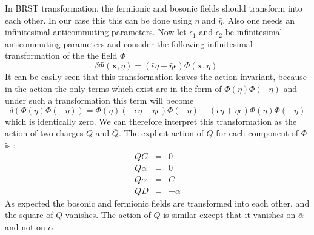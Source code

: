 \documentclass[a4paper,11pt]{article}
\begin{document}
In BRST transformation, the fermionic and bosonic fields should
transform into each other. In our case this this can be done using
$\eta$ and $\bar{\eta}$. Also one needs an infinitesimal
anticommuting parameters. Now let $\epsilon_1$ and $\epsilon_2$
be infinitesimal anticommuting parameters and consider the
following infinitesimal transformation of the the field $\Phi$
\begin{equation}\label{BRST Tr.}
\delta\Phi(\mathbf{x},\eta)=(\bar{\epsilon}\eta +
\bar{\eta}\epsilon) \Phi(\mathbf{x},\eta).
\end{equation}
It can be easily seen that this transformation leaves the action
invariant, because in the action the only terms which exist are
in the form of $\Phi(\eta)\Phi(-\eta)$ and under such a
transformation this term will become
\begin{equation}\label{delta phi2}
\delta(\Phi(\eta)\Phi(-\eta))=\Phi(\eta)(-\bar{\epsilon}\eta -
\bar{\eta}\epsilon) \Phi(-\eta)+(\bar{\epsilon}\eta +
\bar{\eta}\epsilon) \Phi(\eta)\Phi(-\eta)
\end{equation}
which is identically zero. We can therefore interpret this
transformation as the action of two charges $Q$ and $\bar{Q}$. The
explicit action of $Q$ for each component of $\Phi$ is :
\begin{eqnarray}
Q C&=&0 \\
Q \alpha&=&0 \\
Q \bar{\alpha}&=&C\\
Q D&=&-\alpha
\end{eqnarray}
As expected the bosonic and fermionic fields are transformed into
each other, and the square of $Q$ vanishes. The action of
$\bar{Q}$ is similar except that it vanishes on $\bar{\alpha}$
and not on $\alpha$.
\end{document}
